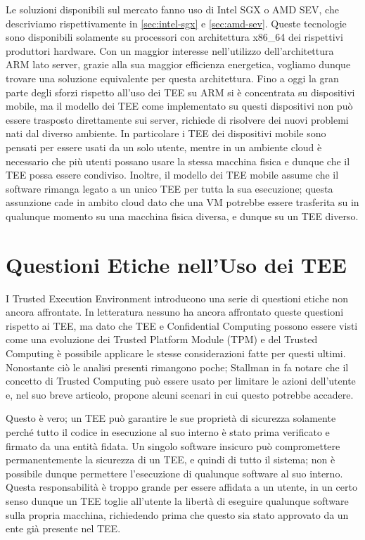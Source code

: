 \documentclass[12pt,italian]{report}
\begin{document}
Le soluzioni disponibili sul mercato fanno uso di Intel SGX
o AMD SEV, che descriviamo rispettivamente in \ref{sec:intel-sgx} e
\ref{sec:amd-sev}. Queste tecnologie sono disponibili solamente su processori
con architettura x86\_64 dei rispettivi produttori hardware.
Con un maggior interesse nell'utilizzo dell'architettura ARM lato server, %
grazie alla sua maggior efficienza energetica, %
vogliamo dunque trovare una soluzione equivalente per questa architettura.
Fino a oggi la gran parte degli sforzi rispetto all'uso dei TEE su ARM
si è concentrata su dispositivi mobile, ma il modello dei TEE come implementato
su questi dispositivi non può essere trasposto direttamente sui server,
richiede di risolvere dei nuovi problemi nati dal diverso ambiente.
In particolare i TEE dei dispositivi mobile sono pensati per essere usati
da un solo utente, mentre in un ambiente cloud è necessario che più utenti
possano usare la stessa macchina fisica e dunque che il TEE possa essere
condiviso.
Inoltre, il modello dei TEE mobile assume che il software rimanga legato a
un unico TEE per tutta la sua esecuzione; questa assunzione cade in ambito
cloud dato che una VM potrebbe essere trasferita su in qualunque momento su
una macchina fisica diversa, e dunque su un TEE diverso.

\section{Questioni Etiche nell'Uso dei TEE}
\label{sec:etica-tee}
I Trusted Execution Environment introducono una serie di questioni etiche
non ancora affrontate.
In letteratura nessuno ha ancora affrontato queste questioni rispetto ai TEE,
ma dato che TEE e Confidential Computing possono essere visti come una
evoluzione dei Trusted Platform Module (TPM) e del Trusted Computing 
è possibile applicare le stesse considerazioni fatte per questi ultimi.
Nonostante ciò le analisi presenti rimangono poche; Stallman in
\cite{stallman2021tpm} fa notare che il concetto di Trusted Computing può
essere usato per limitare le azioni dell'utente e, nel suo breve articolo,
propone alcuni scenari in cui questo potrebbe accadere. 

Questo è vero; un TEE può garantire le sue proprietà di sicurezza solamente
perché tutto il codice in esecuzione al suo interno è stato prima verificato
e firmato da una entità fidata.
Un singolo software insicuro può compromettere permanentemente la sicurezza
di un TEE, e quindi di tutto il sistema; non è possibile dunque permettere
l'esecuzione di qualunque software al suo interno.
Questa responsabilità è troppo grande per essere affidata a un utente,
in un certo senso dunque un TEE toglie all'utente la libertà di eseguire
qualunque software sulla propria macchina, richiedendo prima che questo
sia stato approvato da un ente già presente nel TEE.
\end{document}
